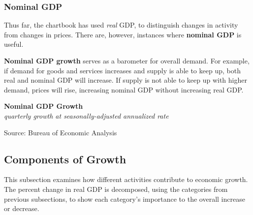 \documentclass{report}
\makeatletter
\newcommand{\tbllink}[1]{\href{https://raw.githubusercontent.com/bdecon/US-chartbook/master/chartbook/data/#1}{\faTable}}
\newcommand*\short[1]{\expandafter\@gobbletwo\number\numexpr#1\relax}
\newcommand{\sbar}[4]{
		\addplot[ybar stacked, bar width=2.3pt, draw opacity=0, fill=#1] 
			table [x=#2, y=#3, col sep=comma]{#4};}
\newcommand{\dateaxisticks}{
		date coordinates in=x, axis line style={draw=none},
		xmax={2023-11-30},
		max space between ticks=40,	    
		xtick={{1990-01-01}, {1992-01-01}, {1994-01-01}, 
			{1996-01-01}, {1998-01-01}, {2000-01-01}, 
			{2002-01-01}, {2004-01-01}, {2006-01-01},
			{2008-01-01}, {2010-01-01}, {2012-01-01}, {2014-01-01},
		    {2016-01-01}, {2018-01-01}, {2020-01-01}, {2022-01-01}, 
		    {2024-01-01}, {2026-01-01}},
		minor xtick={{1989-01-01}, {1991-01-01}, {1993-01-01},
			{1995-01-01}, {1997-01-01}, {1999-01-01}, 
			{2001-01-01}, {2003-01-01}, {2005-01-01}, {2007-01-01},
		    {2009-01-01}, {2011-01-01}, {2013-01-01}, {2015-01-01},
		    {2017-01-01}, {2019-01-01}, {2021-01-01}, {2023-01-01}, 
		    {2025-01-01}, {2027-01-01}},
		enlarge y limits={0.06}, enlarge x limits={0.01},
		xticklabel style={align=center, yshift=-2pt}, tick label style={inner sep=0pt},
		}
\newcommand{\bbar}[2]{extra #1 ticks = {{#2}}, extra #1 tick labels = ,
		extra #1 tick style = {grid=major, grid style={thick, black!25}},}
\newcommand{\rbars}{
		\fill[color=black!10] (axis cs:{1990-07-01},\pgfkeysvalueof{/pgfplots/ymin}) rectangle 
			(axis cs:{1991-03-01}, \pgfkeysvalueof{/pgfplots/ymax});
		\fill[color=black!10] (axis cs:{2007-12-01},\pgfkeysvalueof{/pgfplots/ymin}) rectangle 
			(axis cs:{2009-07-01}, \pgfkeysvalueof{/pgfplots/ymax});
		\fill[color=black!10] (axis cs:{2001-03-01},\pgfkeysvalueof{/pgfplots/ymin}) rectangle 
			(axis cs:{2001-11-01}, \pgfkeysvalueof{/pgfplots/ymax});
		\fill[color=black!10] (axis cs:{2020-02-01},\pgfkeysvalueof{/pgfplots/ymin}) rectangle 
			(axis cs:{2020-05-01}, \pgfkeysvalueof{/pgfplots/ymax});}
\makeatother
\begin{document}
\newpage
\vspace*{-12mm}
 

\begin{minipage}{0.76\textwidth} 
\subsubsection*{Nominal GDP}
\small Thus far, the chartbook has used \textit{real} GDP, to distinguish changes in activity from changes in prices. There are, however, instances where \textbf{nominal GDP} is useful. 

\textbf{Nominal GDP growth} serves as a barometer for overall demand. For example, if demand for goods and services increases and supply is able to keep up, both real and nominal GDP will increase. If supply is not able to keep up with higher demand, prices will rise, increasing nominal GDP without increasing real GDP.


\vspace{1mm}

\normalsize \textbf{Nominal GDP Growth}\\
\footnotesize{\textit{quarterly growth at seasonally-adjusted annualized rate}}
\vspace{3.15cm}

\hspace{3mm} 
\vspace{-1mm}

\footnotesize{Source: Bureau of Economic Analysis} \hfill \tbllink{ngdp_gr.csv}
\vspace{1mm}

\hypertarget{oegc}{\label{oegc}}   
\subsection*{Components of Growth}
\small This subsection examines how different activities contribute to economic growth. The percent change in real GDP is decomposed, using the categories from previous subsections, to show each category's importance to the overall increase or decrease. 


\end{minipage}
\end{document}
